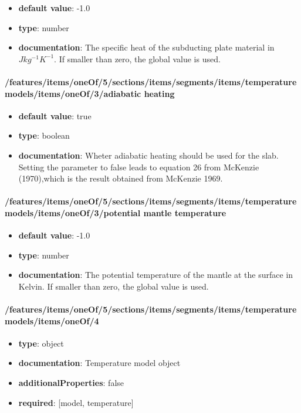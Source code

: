 \begin{itemize}\item {\bf default value}: -1.0
\item {\bf type}: number
\item {\bf documentation}: The specific heat of the subducting plate material in $J kg^{-1} K^{-1}$. If smaller than zero, the global value is used.
\end{itemize}\paragraph{/features/items/oneOf/5/sections/items/segments/items/temperature models/items/oneOf/3/adiabatic heating}
\begin{itemize}\item {\bf default value}: true
\item {\bf type}: boolean
\item {\bf documentation}: Wheter adiabatic heating should be used for the slab. Setting the parameter to false leads to equation 26 from McKenzie (1970),which is the result obtained from McKenzie 1969.
\end{itemize}\paragraph{/features/items/oneOf/5/sections/items/segments/items/temperature models/items/oneOf/3/potential mantle temperature}
\begin{itemize}\item {\bf default value}: -1.0
\item {\bf type}: number
\item {\bf documentation}: The potential temperature of the mantle at the surface in Kelvin. If smaller than zero, the global value is used.
\end{itemize}\paragraph{/features/items/oneOf/5/sections/items/segments/items/temperature models/items/oneOf/4}
\begin{itemize}\item {\bf type}: object
\item {\bf documentation}: Temperature model object
\item {\bf additionalProperties}: false
\item {\bf required}: [model, temperature]\end{itemize}
